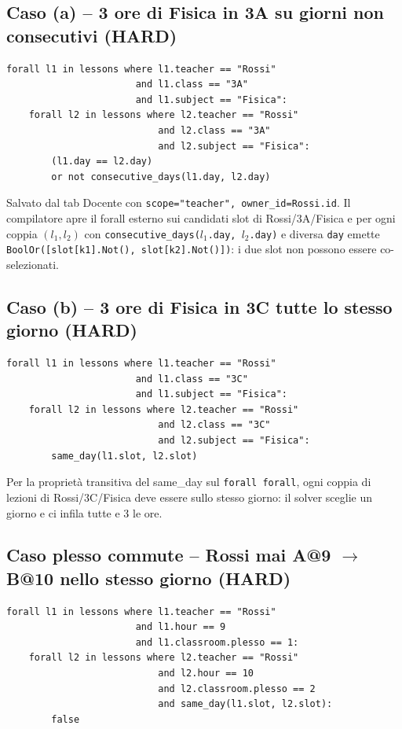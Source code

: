 \subsection{Caso (a) -- 3 ore di Fisica in 3A su giorni non
consecutivi (HARD)}

\begin{lstlisting}
forall l1 in lessons where l1.teacher == "Rossi"
                       and l1.class == "3A"
                       and l1.subject == "Fisica":
    forall l2 in lessons where l2.teacher == "Rossi"
                           and l2.class == "3A"
                           and l2.subject == "Fisica":
        (l1.day == l2.day)
        or not consecutive_days(l1.day, l2.day)
\end{lstlisting}

Salvato dal tab Docente con \texttt{scope="teacher",
owner\_id=Rossi.id}. Il compilatore apre il forall esterno sui
candidati slot di Rossi/3A/Fisica e per ogni coppia $(l_1,l_2)$
con \texttt{consecutive\_days($l_1$.day, $l_2$.day)} e diversa
\texttt{day} emette \texttt{BoolOr([slot[k1].Not(),
slot[k2].Not()])}: i due slot non possono essere co-selezionati.

\subsection{Caso (b) -- 3 ore di Fisica in 3C tutte lo stesso
giorno (HARD)}

\begin{lstlisting}
forall l1 in lessons where l1.teacher == "Rossi"
                       and l1.class == "3C"
                       and l1.subject == "Fisica":
    forall l2 in lessons where l2.teacher == "Rossi"
                           and l2.class == "3C"
                           and l2.subject == "Fisica":
        same_day(l1.slot, l2.slot)
\end{lstlisting}

Per la propriet\`a transitiva del same\_day sul \texttt{forall
forall}, ogni coppia di lezioni di Rossi/3C/Fisica deve essere
sullo stesso giorno: il solver sceglie un giorno e ci infila
tutte e 3 le ore.

\subsection{Caso plesso commute -- Rossi mai A@9 $\to$ B@10
nello stesso giorno (HARD)}

\begin{lstlisting}
forall l1 in lessons where l1.teacher == "Rossi"
                       and l1.hour == 9
                       and l1.classroom.plesso == 1:
    forall l2 in lessons where l2.teacher == "Rossi"
                           and l2.hour == 10
                           and l2.classroom.plesso == 2
                           and same_day(l1.slot, l2.slot):
        false
\end{lstlisting}

